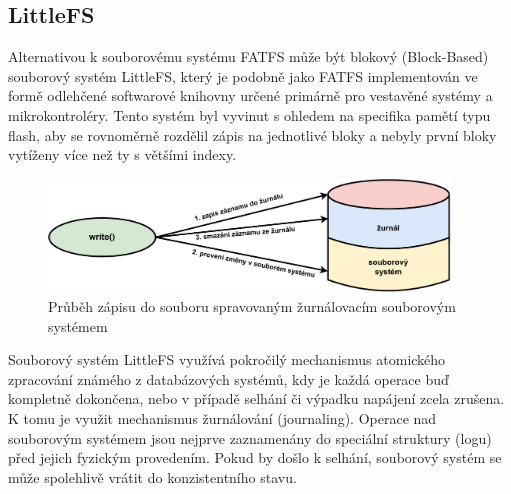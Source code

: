 \subsection{LittleFS}
Alternativou k souborovému systému FATFS může být blokový (Block-Based) souborový systém LittleFS, který je podobně jako FATFS implementován ve formě odlehčené softwarové knihovny určené primárně pro vestavěné systémy a mikrokontroléry.  Tento systém byl vyvinut s ohledem na specifika pamětí typu flash, aby se rovnoměrně rozdělil zápis na jednotlivé bloky a nebyly první bloky vytíženy více než ty s většími indexy.

\begin{figure}[h]
    \centering
    \includegraphics[width=0.95\textwidth]{obrazky-figures/journaling-cz.pdf}
    
    \caption{Průběh zápisu do souboru spravovaným žurnálovacím souborovým systémem \cite{architecture_and_design_of_the_linux_storage_stack}}
    \label{fig:journaling}
\end{figure}


Souborový systém LittleFS využívá pokročilý mechanismus atomického zpracování známého z databázových systémů, kdy je každá operace buď kompletně dokončena, nebo v případě selhání či výpadku napájení zcela zrušena. K tomu je využit mechanismus žurnálování (journaling). Operace nad souborovým systémem jsou nejprve zaznamenány do speciální struktury (logu) před jejich fyzickým provedením. Pokud by došlo k selhání, souborový systém se může spolehlivě vrátit do konzistentního stavu.

